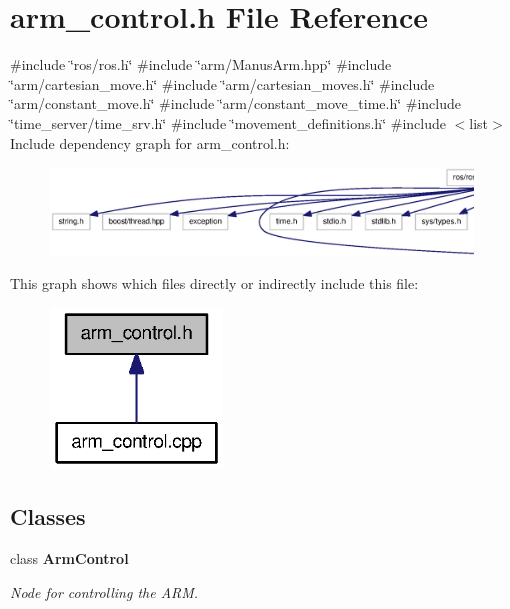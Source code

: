 \section{arm\-\_\-control.\-h \-File \-Reference}
\label{arm__control_8h}
{\ttfamily \#include \char`\"{}ros/ros.\-h\char`\"{}}\*
{\ttfamily \#include \char`\"{}arm/\-Manus\-Arm.\-hpp\char`\"{}}\*
{\ttfamily \#include \char`\"{}arm/cartesian\-\_\-move.\-h\char`\"{}}\*
{\ttfamily \#include \char`\"{}arm/cartesian\-\_\-moves.\-h\char`\"{}}\*
{\ttfamily \#include \char`\"{}arm/constant\-\_\-move.\-h\char`\"{}}\*
{\ttfamily \#include \char`\"{}arm/constant\-\_\-move\-\_\-time.\-h\char`\"{}}\*
{\ttfamily \#include \char`\"{}time\-\_\-server/time\-\_\-srv.\-h\char`\"{}}\*
{\ttfamily \#include \char`\"{}movement\-\_\-definitions.\-h\char`\"{}}\*
{\ttfamily \#include $<$list$>$}\*
\-Include dependency graph for arm\-\_\-control.\-h\-:\nopagebreak
\begin{figure}[H]
\begin{center}
\leavevmode
\includegraphics[width=350pt]{arm__control_8h__incl}
\end{center}
\end{figure}
\-This graph shows which files directly or indirectly include this file\-:\nopagebreak
\begin{figure}[H]
\begin{center}
\leavevmode
\includegraphics[width=130pt]{arm__control_8h__dep__incl}
\end{center}
\end{figure}
\subsection*{\-Classes}
\begin{DoxyCompactItemize}
\item 
class {\bf \-Arm\-Control}
\begin{DoxyCompactList}\small\item\em \-Node for controlling the \-A\-R\-M. \end{DoxyCompactList}\end{DoxyCompactItemize}
